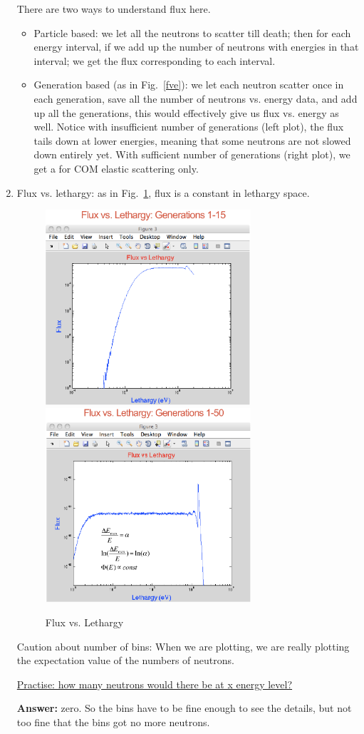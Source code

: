 \documentclass{school-22.211-notes}
\begin{document}
\begin{enumerate}
There are two ways to understand flux here. 
\begin{itemize}
\item Particle based: we let all the neutrons to scatter till death; then for each energy interval, if we add up the number of neutrons with energies in that interval; we get the flux corresponding to each interval.  
\item Generation based (as in Fig.~\ref{fve}): we let each neutron scatter once in each generation, save all the number of neutrons vs. energy data, and add up all the generations, this would effectively give us flux vs. energy as well. Notice with insufficient number of generations (left plot), the flux tails down at lower energies, meaning that some neutrons are not slowed down entirely yet. With sufficient number of generations (right plot), we get a  for COM elastic scattering only. 
\end{itemize}

\item Flux vs. lethargy: as in Fig.~\ref{fvl}, flux is a constant in lethargy space. 
\begin{figure}[ht]
  \centering
  \includegraphics[width=3in]{images/sl-d/flux-vs-lethargy-1.png}
  \includegraphics[width=3in]{images/sl-d/flux-vs-lethargy-2.png}
  \caption{Flux vs. Lethargy} \label{fvl}
\end{figure}

Caution about number of bins: When we are plotting, we are really plotting the expectation value of the numbers of neutrons. 

\uline{Practise: how many neutrons would there be at x energy level?}  

\textbf{Answer:} zero. So the bins have to be fine enough to see the details, but not too fine that the bins got no more neutrons. 
\end{enumerate}
\end{document}
